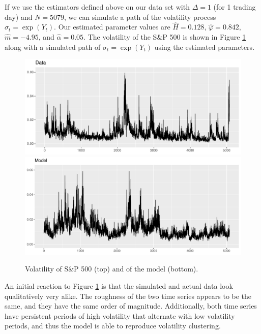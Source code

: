 If we use the estimators defined above on our data set with $\Delta=1$ (for 1 trading day) and $N=5079$, we can simulate a path of the volatility process $\sigma_{t}=\exp(Y_{t})$. Our estimated parameter values are $\hat{H}=0.128$, $\hat{\varphi}=0.842$, $\hat{m} = -4.95$, and $\hat{\alpha} = 0.05$. The volatility of the S\&P 500 is shown in Figure \ref{fig:datavol_modelvol} along with a simulated path of $\sigma_{t}=\exp(Y_{t})$ using the estimated parameters.
\begin{figure}[H]
    \centering
    \includegraphics[scale=0.65]{fig/img/RealizedLib/RealizedVolWithoutDates.pdf}
    \includegraphics[scale=0.6]{fig/img/RealizedLib/simulated_vol_ny.pdf}
    \caption{Volatility of S\&P 500 (top) and of the model (bottom).}
    \label{fig:datavol_modelvol}
\end{figure}
An initial reaction to Figure \ref{fig:datavol_modelvol} is that the simulated and actual data look qualitatively very alike. The roughness of the two time series appears to be the same, and they have the same order of magnitude. Additionally, both time series have persistent periods of high volatility that alternate with low volatility periods, and thus the model is able to reproduce volatility clustering.
